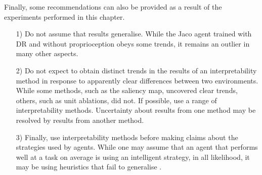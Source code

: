 Finally, some recommendations can also be provided as a result of the experiments performed in this chapter.
\begin{itemize}
\item[1)] Do not assume that results generalise. While the Jaco agent trained with DR and without proprioception obeys some trends, it remains an outlier in many other aspects.
\item[2)] Do not expect to obtain distinct trends in the results of an interpretability method in response to apparently clear differences between two environments. While some methods, such as the saliency map, uncovered clear trends, others, such as unit ablations, did not. If possible, use a range of interpretability methods. Uncertainty about results from one method may be resolved by results from another method.
\item[3)] Finally, use interpretability methods before making claims about the strategies used by agents. While one may assume that an agent that performs well at a task on average is using an intelligent strategy, in all likelihood, it may be using heuristics that fail to generalise \cite{ruderman2019uncovering}.
\end{itemize}

\label{ch6:discussion}